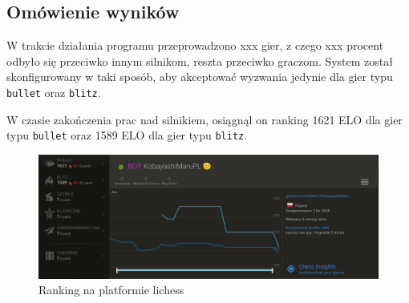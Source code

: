 \subsection{Omówienie wyników}
\label{subsec:omowienie-wynikow}

W trakcie działania programu przeprowadzono xxx gier, z czego xxx procent odbyło się przeciwko innym silnikom, reszta przeciwko graczom.
System został skonfigurowany w taki sposób, aby akceptować wyzwania jedynie dla gier typu \texttt{bullet} oraz \texttt{blitz}.

W czasie zakończenia prac nad silnikiem, osiągnąl on ranking 1621 ELO dla gier typu \texttt{bullet} oraz 1589 ELO dla gier typu \texttt{blitz}.

\begin{figure}[ht]
    \centering
    \includegraphics[width=1\linewidth]{rozdzialy/rozdzial03/2_porownanie-z-innymi-silnikami/rysunki/lichess-ranking}
    \caption{Ranking na platformie lichess}
    \label{fig:lichess-ranking}
\end{figure}